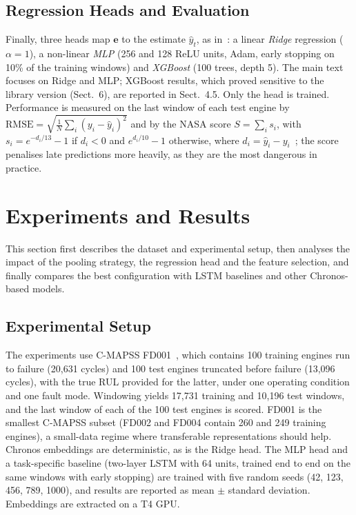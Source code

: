 \documentclass{svproc}
\begin{document}
\subsection{Regression Heads and Evaluation}

Finally, three heads map $\mathbf{e}$ to the estimate $\hat{y}_t$, as
in~\cite{imsa2025}: a linear \textit{Ridge} regression ($\alpha = 1$), a
non-linear \textit{MLP} (256 and 128 ReLU units, Adam, early stopping on
10\% of the training windows) and \textit{XGBoost} (100 trees, depth 5).
The main text focuses on Ridge and MLP; XGBoost results, which proved
sensitive to the library version (Sect.~6), are reported in Sect.~4.5. Only the head is trained. Performance is measured on the last window of each test
engine by $\text{RMSE} = \sqrt{\tfrac{1}{N}\sum_{i}(y_i - \hat{y}_i)^2}$
and by the NASA score $S = \sum_i s_i$, with $s_i = e^{-d_i/13} - 1$ if
$d_i < 0$ and $e^{d_i/10} - 1$ otherwise, where
$d_i = \hat{y}_i - y_i$~\cite{saxena2008}; the score penalises late
predictions more heavily, as they are the most dangerous in practice.

\section{Experiments and Results}

This section first describes the dataset and experimental setup, then
analyses the impact of the pooling strategy, the regression head and the
feature selection, and finally compares the best configuration with LSTM
baselines and other Chronos-based models.

\subsection{Experimental Setup}

The experiments use C-MAPSS FD001~\cite{cmapss}, which contains 100
training engines run to failure (20,631 cycles) and 100 test engines
truncated before failure (13,096 cycles), with the true RUL provided for
the latter, under one operating condition and one fault mode. Windowing
yields 17,731 training and 10,196 test windows, and the last window of
each of the 100 test engines is scored. FD001 is the smallest C-MAPSS
subset (FD002 and FD004 contain 260 and 249 training engines), a
small-data regime where transferable representations should help. Chronos embeddings are
deterministic, as is the Ridge head. The MLP head and a task-specific
baseline (two-layer LSTM with 64 units, trained end to end on the same
windows with early stopping) are trained with five random seeds (42, 123,
456, 789, 1000), and results are reported as mean $\pm$ standard
deviation. Embeddings are extracted on a T4 GPU.
\end{document}
